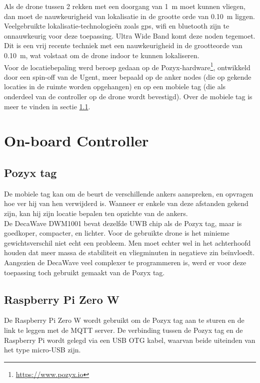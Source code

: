 Als de drone tussen 2 rekken met een doorgang van \SI{1}{\m} moet kunnen vliegen, dan moet de nauwkeurigheid van lokalisatie in de grootte orde van \SI{0.10}{\m} liggen. Veelgebruikte lokalisatie-technologie\"en zoals gps, wifi en bluetooth zijn te onnauwkeurig voor deze toepassing. Ultra Wide Band komt deze noden tegemoet. Dit is een vrij recente techniek met een nauwkeurigheid in de grootteorde van \SI{0.10}{\m}, wat volstaat om de drone indoor te kunnen lokaliseren.\\

Voor de locatiebepaling werd beroep gedaan op de Pozyx-hardware\footnote{\url{https://www.pozyx.io}}, ontwikkeld door een spin-off van de Ugent, meer bepaald op de anker nodes (die op gekende locaties in de ruimte worden opgehangen) en op een mobiele tag (die als onderdeel van de controller op de drone wordt bevestigd). 
Over de mobiele tag is meer te vinden in sectie \ref{sec:pozyx_tag}.

\section{On-board Controller} \label{sec:onboard_controller}
\subsection{Pozyx tag}  \label{sec:pozyx_tag}
De mobiele tag kan om de beurt de verschillende ankers aanspreken, en opvragen hoe ver hij van hen verwijderd is. Wanneer er enkele van deze afstanden gekend zijn, kan hij zijn locatie bepalen ten opzichte van de ankers.\\

De DecaWave DWM1001 bevat dezelfde UWB chip als de Pozyx tag, maar is goedkoper, compacter, en lichter.
Voor de gebruikte drone is het minieme gewichtsverschil niet echt een probleem.
Men moet echter wel in het achterhoofd houden dat meer massa de stabiliteit en vliegminuten in negatieve zin be\"invloedt.\\
Aangezien de DecaWave veel complexer te programmeren is, werd er voor deze toepassing toch gebruikt gemaakt van de Pozyx tag.

\subsection{Raspberry Pi Zero W} \label{sec:raspberry_pi}
De Raspberry Pi Zero W wordt gebruikt om de Pozyx tag aan te sturen en de link te leggen met de MQTT server.
De verbinding tussen de Pozyx tag en de Raspberry Pi wordt gelegd via een USB OTG kabel, waarvan beide uiteinden van het type micro-USB zijn.

